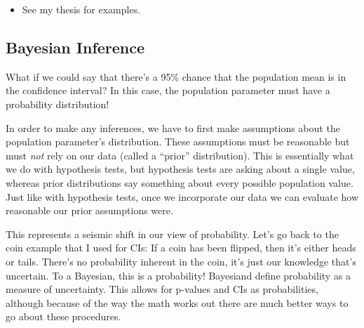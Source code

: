 \documentclass[
  letterpaper,
  DIV=11,
  numbers=noendperiod]{scrreprt}
\providecommand{\tightlist}{%
  \setlength{\itemsep}{0pt}\setlength{\parskip}{0pt}}\usepackage{longtable,booktabs,array}
\begin{document}
\begin{itemize}
  \begin{itemize}
  \tightlist
  \item
    See my thesis for examples.
  \end{itemize}
\end{itemize}

\hypertarget{bayesian-inference}{%
\subsection{Bayesian Inference}\label{bayesian-inference}}

What if we could say that there's a 95\% chance that the population mean
is in the confidence interval? In this case, the population parameter
must have a probability distribution!

In order to make any inferences, we have to first make assumptions about
the population parameter's distribution. These assumptions must be
reasonable but must \emph{not} rely on our data (called a ``prior''
distribution). This is essentially what we do with hypothesis tests, but
hypothesis tests are asking about a single value, whereas prior
distributions say something about every possible population value. Just
like with hypothesis tests, once we incorporate our data we can evaluate
how reasonable our prior assumptions were.

This represents a seismic shift in our view of probability. Let's go
back to the coin example that I used for CIs: If a coin has been
flipped, then it's either heads or tails. There's no probability
inherent in the coin, it's just our knowledge that's uncertain. To a
Bayesian, this is a probability! Bayesiand define probability as a
measure of uncertainty. This allows for p-values and CIs as
probabilities, although because of the way the math works out there are
much better ways to go about these procedures.
\end{document}

